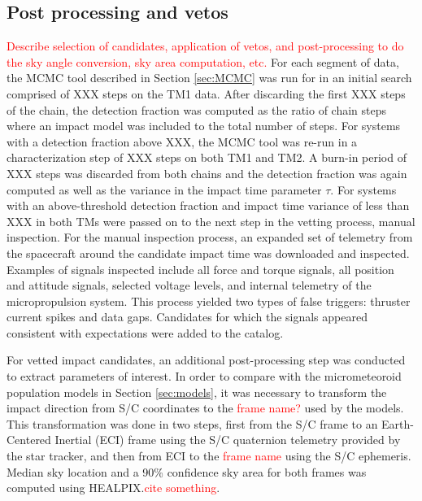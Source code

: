 \documentclass[preprint, trackchanges]{aastex61}
\newcommand{\red}[1]{\textcolor{red}{#1}}
\begin{document}
\FloatBarrier
\subsection{Post processing and vetos}\label{sec:vetos}
\red{Describe selection of candidates, application of vetos, and post-processing to do the sky angle conversion, sky area computation, etc.}
For each segment of data, the MCMC tool described in Section \ref{sec:MCMC} was run for in an initial search comprised of XXX steps on the TM1 data. After discarding the first XXX steps of the chain, the detection fraction was computed as the ratio of chain steps where an impact model was included to the total number of steps.  For systems with a detection fraction above XXX, the MCMC tool was re-run in a characterization step of XXX steps on both TM1 and TM2. A burn-in period of XXX steps was discarded from both chains and the detection fraction was again computed as well as the variance in the impact time parameter $\tau$.  For systems with an above-threshold detection fraction and impact time variance of less than XXX in both TMs were passed on to the next step in the vetting process, manual inspection.  For the manual inspection process, an expanded set of telemetry from the spacecraft around the candidate impact time was downloaded and inspected.  Examples of signals inspected include all force and torque signals, all position and attitude signals, selected voltage levels, and internal telemetry of the micropropulsion system. This process yielded two types of false triggers: thruster current spikes and data gaps. Candidates for which the signals appeared consistent with expectations were added to the catalog.

For vetted impact candidates, an additional post-processing step was conducted to extract parameters of interest.  In order to compare with the micrometeoroid population models in Section \ref{sec:models}, it was necessary to transform the impact direction from S/C coordinates to the \red{frame name?} used by the models.  This transformation was done in two steps, first from the S/C frame to an Earth-Centered Inertial (ECI) frame using the S/C quaternion telemetry provided by the star tracker, and then from ECI to the \red{frame name} using the S/C ephemeris. Median sky location and a 90\% confidence sky area for both frames was computed using HEALPIX.\red{cite something}.

\FloatBarrier
\end{document}
